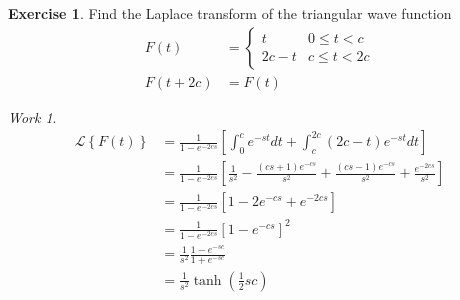 \documentclass{report}
\theoremstyle{definition}
\newtheorem{exercise}{Exercise}[chapter]
\theoremstyle{remark}
\newtheorem*{work}{Work}
\newcommand{\lapt}[1]{\mathscr{L}\left\{ #1\right\}}
\begin{document}
\begin{exercise}
    Find the Laplace transform of the triangular wave function 
    \begin{equation*}
    \begin{split}
        F(t) &= \begin{cases}
            t & 0\leq t < c\\ 2c-t &c\leq t < 2c
        \end{cases} \\
        F(t+2c)&=F(t)
    \end{split}
    \end{equation*}
\end{exercise}
\begin{work}
    \begin{equation*}
        \begin{split}
            \lapt{F(t)} &= \frac{1}{1-e^{-2cs}}\left[ \int^c_0e^{-st}dt + \int^{2c}_{c}(2c-t)e^{-st}dt\right]\\
            &=\frac{1}{1-e^{-2cs}}\left[\frac{1}{s^2}-\frac{(cs+1)e^{-cs}}{s^2} + \frac{(cs-1)e^{-cs}}{s^2}+\frac{e^{-2cs}}{s^2}\right]\\
            &=\frac{1}{1-e^{-2cs}}\left[1-2e^{-cs}+e^{-2cs}\right]\\
            &=\frac{1}{1-e^{-2cs}}\left[1-e^{-cs}\right]^2\\
            &= \frac{1}{s^2}\frac{1-e^{-sc}}{1+e^{-sc}} \\
            &=\frac{1}{s^2}\tanh\left(\tfrac{1}{2}sc\right)
        \end{split}
    \end{equation*}
\end{work}
\end{document}

